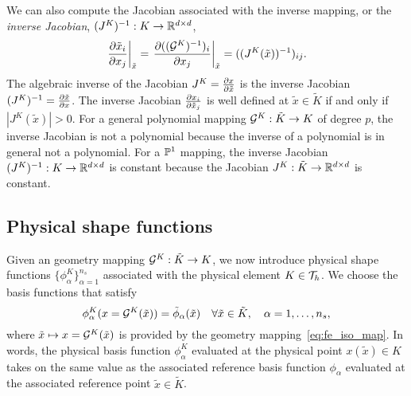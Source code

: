 We can also compute the Jacobian associated with the inverse mapping, or the \emph{inverse Jacobian}, $(J^K)^{-1}: K \to \mathbb{R}^{d \times d}$,
\begin{equation*}
  \left. \frac{\partial \tilde x_i}{\partial x_j} \right|_{\tilde x}
  = \left. \frac{\partial (( \mathcal{G}^K)^{-1})_i}{\partial x_j} \right|_{\tilde x}
  = ((J^K(\tilde x))^{-1})_{ij}.
\end{equation*}
The algebraic inverse of the Jacobian $J^K = \frac{\partial x}{\partial \tilde x}$ is the inverse Jacobian $(J^K)^{-1} = \frac{\partial \tilde x}{\partial x}$. The inverse Jacobian $\frac{\partial x_i}{\partial \tilde x_j}$ is well defined at $\tilde x \in \tilde K$ if and only if $|J^K(\tilde x)| > 0$. For a general polynomial mapping $\mathcal{G}^K: \tilde K \to K$ of degree $p$, the inverse Jacobian is not a polynomial because the inverse of a polynomial is in general not a polynomial.  For a $\mathbb{P}^1$ mapping, the inverse Jacobian $(J^K)^{-1}: K \to \mathbb{R}^{d \times d}$ is constant because the Jacobian $J^K: \tilde K \to \mathbb{R}^{d \times d}$ is constant.

\subsection{Physical shape functions}
  \label{sec:fe_phy_shape}
Given an geometry mapping $\mathcal{G}^K : \tilde K \to K$, we now introduce physical shape functions $\{ \phi^K_\alpha \}_{\alpha=1}^{n_s}$ associated with the physical element $K \in \mathcal{T}_h$.  We choose the basis functions that satisfy
\begin{equation}
  \phi^K_\alpha(x = \mathcal{G}^K(\tilde x)) = \tilde \phi_\alpha(\tilde x) \quad \forall \tilde x \in \tilde K, \quad \alpha =  1, \dots, n_s,
  \label{eq:fe_impl_phiK}
\end{equation}
where $\tilde x \mapsto x = \mathcal{G}^K(\tilde x)$ is provided by the geometry mapping~\eqref{eq:fe_iso_map}. In words, the physical basis function $\phi^K_\alpha$ evaluated at the physical point $x(\tilde x) \in K$ takes on the same value as the associated reference basis function $\phi_\alpha$ evaluated at the associated reference point $\tilde x \in \tilde K$.

